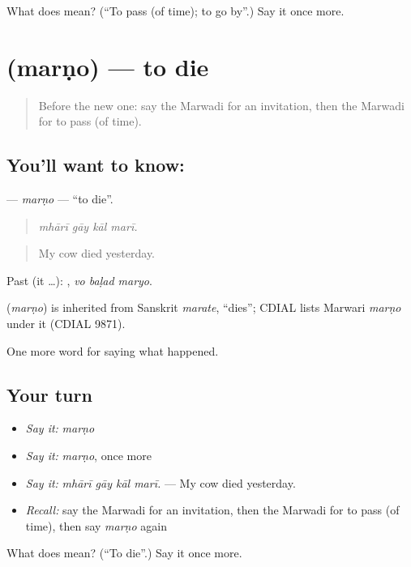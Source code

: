 \begin{tcolorbox}[breakable,colback=teal!4,colframe=teal!35!black,title={Before you move on}]
What does  mean? (\textquotedblleft{}To pass (of time); to go by\textquotedblright{}.) Say it once more.
\end{tcolorbox}
\section[\texorpdfstring{\mw{मरणो} (marṇo)}{मरणो (marṇo)}]{ (marṇo) — to die}

\label{lesson:MW-C246-marno-die}



\begin{quote}
Before the new one: say the Marwadi for an invitation, then the Marwadi for to pass (of time).
\end{quote}

\subsection*{You'll want to know: }
\textbf{} — \emph{marṇo} — \textquotedblleft{}to die\textquotedblright{}.

\begin{quote}
   
\end{quote}

\begin{quote}
\emph{mhārī gāy kāl marī.}
\end{quote}

\begin{quote}
My cow died yesterday.
\end{quote}

Past (it …):   , \emph{vo baḷad maryo}.

\begin{cousinweb}
\textbf{} (\emph{marṇo}) is inherited from Sanskrit \emph{marate}, \textquotedblleft{}dies\textquotedblright{}; CDIAL lists Marwari \emph{marṇo} under it (CDIAL 9871).
\end{cousinweb}

\begin{grammarlens}[title={What you've built}]
One more word for saying what happened.
\end{grammarlens}

\subsection*{Your turn}
\begin{itemize}
\raggedright
  \item \emph{Say it:} \emph{marṇo}
  \item \emph{Say it:} \emph{marṇo}, once more
  \item \emph{Say it:} \emph{mhārī gāy kāl marī.} — My cow died yesterday.
  \item \emph{Recall:} say the Marwadi for an invitation, then the Marwadi for to pass (of time), then say \emph{marṇo} again
\end{itemize}

\begin{tcolorbox}[breakable,colback=teal!4,colframe=teal!35!black,title={Before you move on}]
What does  mean? (\textquotedblleft{}To die\textquotedblright{}.) Say it once more.
\end{tcolorbox}
